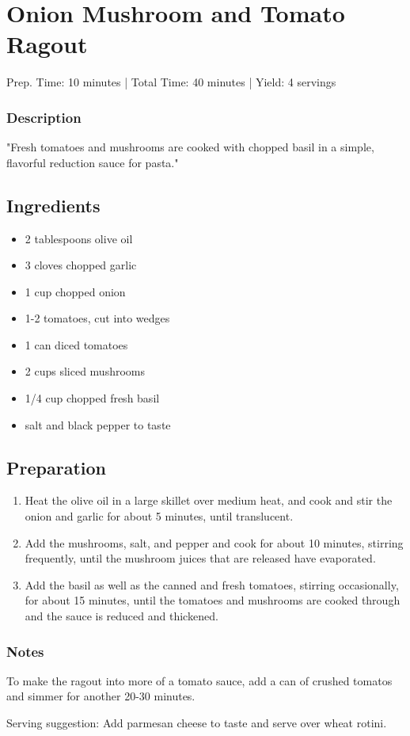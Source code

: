 \section{Onion Mushroom and Tomato Ragout}

\begin{center}
Prep. Time: 10 minutes |
Total Time: 40 minutes | 
Yield: 4 servings
\end{center}

\subsubsection{Description}
"Fresh tomatoes and mushrooms are cooked with chopped basil in a simple, flavorful reduction sauce for pasta."

\subsection{Ingredients}
\begin{multicols}{2}
\begin{itemize}
    \item 2 tablespoons olive oil
    \item 3 cloves chopped garlic
    \item 1 cup chopped onion
    \item 1-2 tomatoes, cut into wedges
    \item 1 can diced tomatoes
    \item 2 cups sliced mushrooms
    \item 1/4 cup chopped fresh basil
    \item salt and black pepper to taste
\end{itemize}
\end{multicols}

\subsection{Preparation}
\begin{enumerate}
    \item Heat the olive oil in a large skillet over medium heat, and cook and stir the onion and garlic for about 5 minutes, until translucent.
    \item Add the mushrooms, salt, and pepper and cook for about 10 minutes, stirring frequently, until the mushroom juices that are released have evaporated.
    \item Add the basil as well as the canned and fresh tomatoes, stirring occasionally, for about 15 minutes, until the tomatoes and mushrooms are cooked through and the sauce is reduced and thickened.
\end{enumerate}

\subsubsection{Notes}
To make the ragout into more of a tomato sauce, add a can of crushed tomatos and simmer for another 20-30 minutes.

\noindent Serving suggestion: Add parmesan cheese to taste and serve over wheat rotini.
